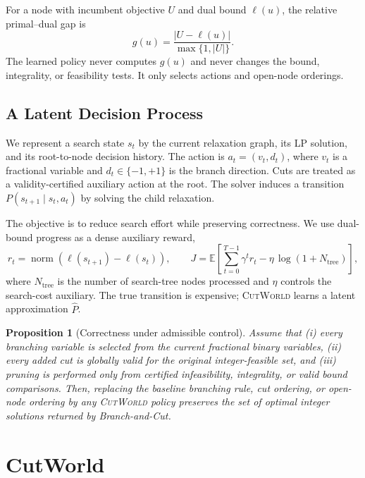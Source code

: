 \documentclass[11pt,a4paper]{article}
\newtheorem{proposition}{Proposition}
\newcommand{\CutWorld}{\textsc{CutWorld}}
\begin{document}
For a node with incumbent objective $U$ and dual bound $\ell(u)$, the relative primal--dual gap is
\begin{equation}
  g(u)=\frac{|U-\ell(u)|}{\max\{1,|U|\}} .
  \label{eq:gap}
\end{equation}
The learned policy never computes $g(u)$ and never changes the bound, integrality, or feasibility tests. It only selects actions and open-node orderings.

\subsection{A Latent Decision Process}

We represent a search state $s_t$ by the current relaxation graph, its LP
solution, and its root-to-node decision history. The action is
$a_t=(v_t,d_t)$, where $v_t$ is a fractional variable and
$d_t\in\{-1,+1\}$ is the branch direction. Cuts are treated as a
validity-certified auxiliary action at the root. The solver induces a
transition $P(s_{t+1}\mid s_t,a_t)$ by solving the child relaxation.

The objective is to reduce search effort while preserving correctness. We use
dual-bound progress as a dense auxiliary reward,
\begin{equation}
  r_t=\operatorname{norm}\!\left(\ell(s_{t+1})-\ell(s_t)\right),
  \qquad
  J=\mathbb{E}\!\left[\sum_{t=0}^{T-1}\gamma^t r_t
      -\eta\,\log(1+N_{\mathrm{tree}})\right],
  \label{eq:mdp-return}
\end{equation}
where $N_{\mathrm{tree}}$ is the number of search-tree nodes processed and
$\eta$ controls the search-cost auxiliary. The true transition is expensive;
\CutWorld{} learns a latent approximation $\widehat P$.

\begin{proposition}[Correctness under admissible control]
\label{prop:correctness}
Assume that (i) every branching variable is selected from the current fractional binary variables, (ii) every added cut is globally valid for the original integer-feasible set, and (iii) pruning is performed only from certified infeasibility, integrality, or valid bound comparisons. Then, replacing the baseline branching rule, cut ordering, or open-node ordering by any \CutWorld{} policy preserves the set of optimal integer solutions returned by Branch-and-Cut.
\end{proposition}




\section{CutWorld}
\label{sec:method}
\end{document}
